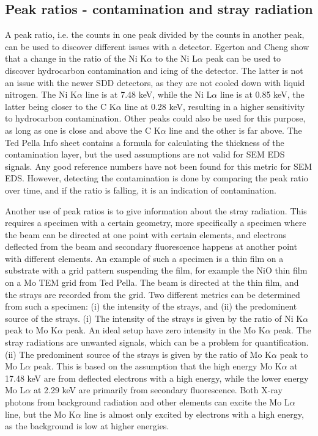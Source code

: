 \subsection{Peak ratios - contamination and stray radiation}
\label{theory:detector_status:peakratio}

A peak ratio, i.e. the counts in one peak divided by the counts in another peak, can be used to discover different issues with a detector.
Egerton and Cheng \cite{egerton_nio_characterization_1994} show that a change in the ratio of the Ni K$\alpha$ to the Ni L$\alpha$ peak can be used to discover hydrocarbon contamination and icing of the detector.
The latter is not an issue with the newer SDD detectors, as they are not cooled down with liquid nitrogen.
The Ni K$\alpha$ line is at 7.48 keV, while the Ni L$\alpha$ line is at 0.85 keV, the latter being closer to the C K$\alpha$ line at 0.28 keV, resulting in a higher sensitivity to hydrocarbon contamination.
Other peaks could also be used for this purpose, as long as one is close and above the C K$\alpha$ line and the other is far above.
The Ted Pella Info sheet \cite{ted_pella_nio_tem_2019} contains a formula for calculating the thickness of the contamination layer, but the used assumptions are not valid for SEM EDS signals.
Any good reference numbers have not been found for this metric for SEM EDS.
However, detecting the contamination is done by comparing the peak ratio over time, and if the ratio is falling, it is an indication of contamination.

Another use of peak ratios is to give information about the stray radiation.
This requires a specimen with a certain geometry, more specifically a specimen where the beam can be directed at one point with certain elements, and electrons deflected from the beam and secondary fluorescence happens at another point with different elements.
An example of such a specimen is a thin film on a substrate with a grid pattern suspending the film, for example the NiO thin film on a Mo TEM grid from Ted Pella.
The beam is directed at the thin film, and the strays are recorded from the grid.
Two different metrics can be determined from such a specimen: (i) the intensity of the strays, and (ii) the predominent source of the strays.
(i) The intensity of the strays is given by the ratio of Ni K$\alpha$ peak to Mo K$\alpha$ peak.
An ideal setup have zero intensity in the Mo K$\alpha$ peak.
The stray radiations are unwanted signals, which can be a problem for quantification.
(ii) The predominent source of the strays is given by the ratio of Mo K$\alpha$ peak to Mo L$\alpha$ peak.
This is based on the assumption that the high energy Mo K$\alpha$ at 17.48 keV are from deflected electrons with a high energy, while the lower energy Mo L$\alpha$ at 2.29 keV are primarily from secondary fluorescence.
Both X-ray photons from background radiation and other elements can excite the Mo L$\alpha$ line, but the Mo K$\alpha$ line is almost only excited by electrons with a high energy, as the background is low at higher energies.


